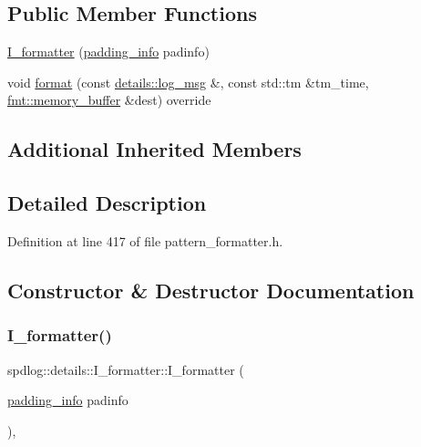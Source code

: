\subsection*{Public Member Functions}
\begin{DoxyCompactItemize}
\item 
\hyperlink{classspdlog_1_1details_1_1_i__formatter_a33599ccfecedd0d409c91792ffa82fbc}{I\+\_\+formatter} (\hyperlink{structspdlog_1_1details_1_1padding__info}{padding\+\_\+info} padinfo)
\item 
void \hyperlink{classspdlog_1_1details_1_1_i__formatter_ab9d6511acc53b2296ecce30f715779c7}{format} (const \hyperlink{structspdlog_1_1details_1_1log__msg}{details\+::log\+\_\+msg} \&, const std\+::tm \&tm\+\_\+time, \hyperlink{format_8h_a21cbf729f69302f578e6db21c5e9e0d2}{fmt\+::memory\+\_\+buffer} \&dest) override
\end{DoxyCompactItemize}
\subsection*{Additional Inherited Members}


\subsection{Detailed Description}


Definition at line 417 of file pattern\+\_\+formatter.\+h.



\subsection{Constructor \& Destructor Documentation}
\mbox{\label{classspdlog_1_1details_1_1_i__formatter_a33599ccfecedd0d409c91792ffa82fbc}} 
\subsubsection{\texorpdfstring{I\+\_\+formatter()}{I\_formatter()}}
{\footnotesize\ttfamily spdlog\+::details\+::\+I\+\_\+formatter\+::\+I\+\_\+formatter (\begin{DoxyParamCaption}\item[{\hyperlink{structspdlog_1_1details_1_1padding__info}{padding\+\_\+info}}]{padinfo }\end{DoxyParamCaption})\hspace{0.3cm}{\ttfamily [inline]}, {\ttfamily [explicit]}}



